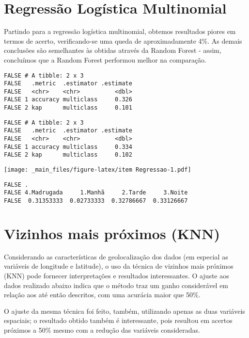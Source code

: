 \documentclass[
  12pt,
]{report}
\begin{document}
\hypertarget{regressuxe3o-loguxedstica-multinomial}{%
\section{Regressão Logística Multinomial}\label{regressuxe3o-loguxedstica-multinomial}}

Partindo para a regressão logística multinomial, obtemos resultados piores em termos de acerto, verificando-se uma queda de aproximadamente 4\%. As demais conclusões são semelhantes às obtidas através da Random Forest - assim, concluímos que a Random Forest performou melhor na comparação.

\begin{verbatim}
FALSE # A tibble: 2 x 3
FALSE   .metric  .estimator .estimate
FALSE   <chr>    <chr>          <dbl>
FALSE 1 accuracy multiclass     0.326
FALSE 2 kap      multiclass     0.101
\end{verbatim}

\begin{verbatim}
FALSE # A tibble: 2 x 3
FALSE   .metric  .estimator .estimate
FALSE   <chr>    <chr>          <dbl>
FALSE 1 accuracy multiclass     0.334
FALSE 2 kap      multiclass     0.102
\end{verbatim}

\texttt{[image: \_main\_files/figure-latex/item Regressao-1.pdf]}

\begin{verbatim}
FALSE .
FALSE 4.Madrugada     1.Manhã     2.Tarde     3.Noite 
FALSE  0.31353333  0.02733333  0.32786667  0.33126667
\end{verbatim}

\hypertarget{vizinhos-mais-pruxf3ximos-knn}{%
\section{Vizinhos mais próximos (KNN)}\label{vizinhos-mais-pruxf3ximos-knn}}

Considerando as características de geolocalização dos dados (em especial as variáveis de longitude e latitude), o uso da técnica de vizinhos mais próximos (KNN) pode fornecer interpretações e resultados interessantes. O ajuste aos dados realizado abaixo indica que o método traz um ganho considerável em relação aos até então descritos, com uma acurácia maior que 50\%.

O ajuste da mesma técnica foi feito, também, utilizando apenas as duas variáveis espaciais; o resultado obtido também é interessante, pois resultou em acertos próximos a 50\% mesmo com a redução das variáveis consideradas.
\end{document}

